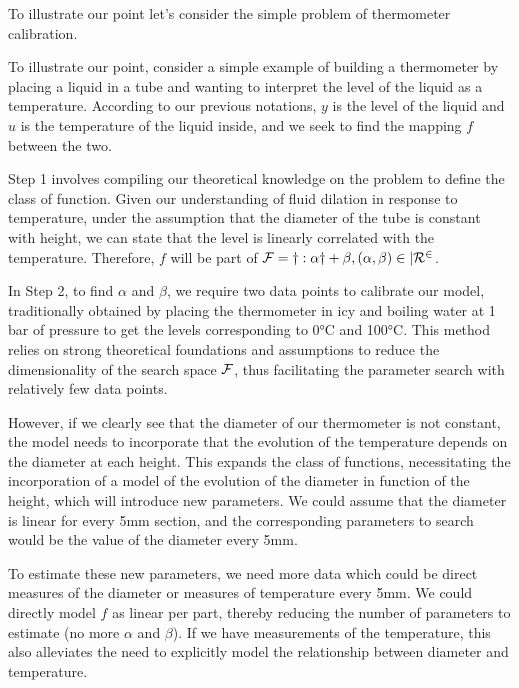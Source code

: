 \begin{bibunit}
{{{{  To illustrate our point let's consider the simple problem of thermometer calibration.





To illustrate our point, consider a simple example of building a thermometer by placing a liquid in a tube and wanting to interpret the level of the liquid as a temperature. According to our previous notations, $y$ is the level of the liquid and $u$ is the temperature of the liquid inside, and we seek to find the mapping $f$ between the two.

Step 1 involves compiling our theoretical knowledge on the problem to define the class of function. Given our understanding of fluid dilation in response to temperature, under the assumption that the diameter of the tube is constant with height, we can state that the level is linearly correlated with the temperature. Therefore, $f$ will be part of $\cal{F} = { y: \alpha y + \beta , (\alpha, \beta) \in |R^2 }$.

In Step 2, to find $\alpha$ and $\beta$, we require two data points to calibrate our model, traditionally obtained by placing the thermometer in icy and boiling water at 1 bar of pressure to get the levels corresponding to 0°C and 100°C. This method relies on strong theoretical foundations and assumptions to reduce the dimensionality of the search space $\cal{F}$, thus facilitating the parameter search with relatively few data points.

However, if we clearly see that the diameter of our thermometer is not constant, the model needs to incorporate that the evolution of the temperature depends on the diameter at each height. This expands the class of functions, necessitating the incorporation of a model of the evolution of the diameter in function of the height, which will introduce new parameters. We could assume that the diameter is linear for every 5mm section, and the corresponding parameters to search would be the value of the diameter every 5mm.

To estimate these new parameters, we need more data which could be direct measures of the diameter or measures of temperature every 5mm. We could directly model $f$ as linear per part, thereby reducing the number of parameters to estimate (no more $\alpha$ and $\beta$). If we have measurements of the temperature, this also alleviates the need to explicitly model the relationship between diameter and temperature.





}}}}
\end{bibunit}
